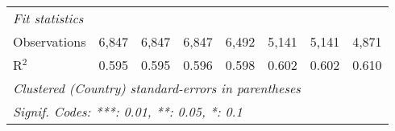 \begin{tabular}{lccccccc}
   \midrule \emph{Fit statistics}\\
   Observations                                                                 & 6,847          & 6,847          & 6,847          & 6,492          & 5,141   & 5,141   & 4,871\\  
   R$^2$                                                                        & 0.595          & 0.595          & 0.596          & 0.598          & 0.602   & 0.602   & 0.610\\  
   \midrule
   \multicolumn{8}{l}{\emph{Clustered (Country) standard-errors in parentheses}}\\
   \multicolumn{8}{l}{\emph{Signif. Codes: ***: 0.01, **: 0.05, *: 0.1}}\\
\end{tabular}
\par\endgroup



